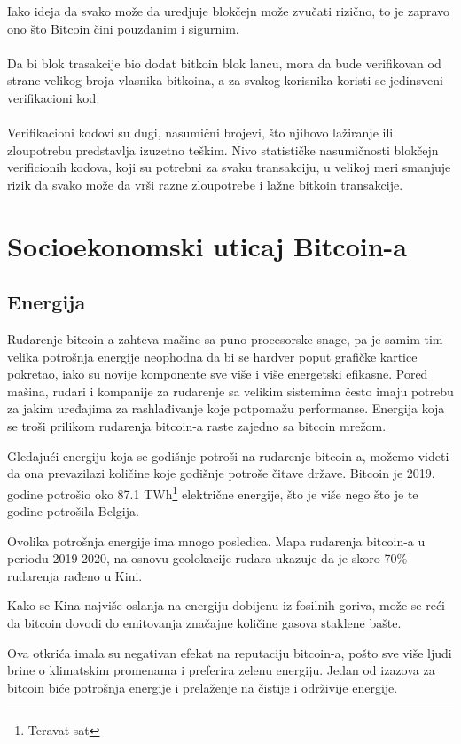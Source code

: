 \documentclass[a4paper]{article}
\begin{document}
Iako ideja da svako može da uredjuje blokčejn može zvučati rizično, to je zapravo ono što Bitcoin čini pouzdanim i sigurnim.
\\
\\
Da bi blok trasakcije bio dodat bitkoin blok lancu, mora da bude verifikovan od strane velikog broja vlasnika bitkoina, a za svakog korisnika koristi se jedinsveni verifikacioni kod.
\\
\\
Verifikacioni kodovi su dugi, nasumični brojevi, što njihovo lažiranje ili zloupotrebu predstavlja izuzetno teškim. Nivo statističke nasumičnosti blokčejn verificionih kodova, koji su potrebni za svaku transakciju, u velikoj meri smanjuje rizik da svako može da vrši razne zloupotrebe i lažne bitkoin transakcije.


\section{Socioekonomski uticaj Bitcoin-a}

\subsection{Energija}

Rudarenje bitcoin-a zahteva mašine sa puno procesorske snage, pa je samim tim velika potrošnja energije neophodna da bi se hardver poput grafičke kartice pokretao, iako su novije komponente sve više i više energetski efikasne. Pored mašina, rudari i kompanije za rudarenje sa velikim sistemima često imaju potrebu za jakim uređajima za rashlađivanje koje potpomažu performanse. Energija koja se troši prilikom rudarenja bitcoin-a raste zajedno sa bitcoin mrežom.

Gledajući energiju koja se godišnje potroši na rudarenje bitcoin-a, možemo videti da ona prevazilazi količine koje godišnje potroše čitave države. Bitcoin je 2019. godine potrošio oko 87.1 TWh\footnote{Teravat-sat} električne energije, što je više nego što je te godine potrošila Belgija.  \cite{energijapotrosnja}


Ovolika potrošnja energije ima mnogo posledica. Mapa rudarenja bitcoin-a u periodu 2019-2020, na osnovu geolokacije rudara ukazuje da je skoro 70\% rudarenja rađeno u Kini. \cite{energijakina}

Kako se Kina najviše oslanja na energiju dobijenu iz fosilnih goriva, može se reći da bitcoin dovodi do emitovanja značajne količine gasova staklene bašte.

Ova otkrića imala su negativan efekat na reputaciju bitcoin-a, pošto sve više ljudi brine o klimatskim promenama i preferira zelenu energiju. Jedan od izazova za bitcoin biće potrošnja energije i prelaženje na čistije i održivije energije.
\end{document}
